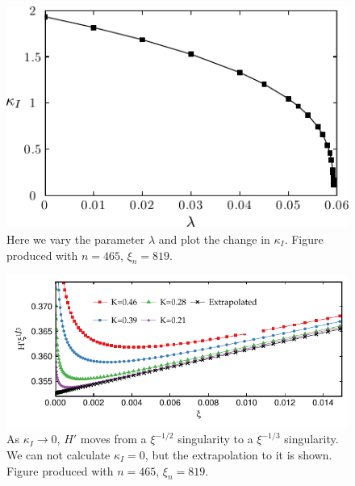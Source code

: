 \documentclass{jfm}
\begin{document}
\begin{figure}
  \centerline{\includegraphics{./../../Graphs/K-lambda-edited.pdf}}
  \caption{Here we vary the parameter $\lambda$ and plot the change in 
           $\kappa_I$. Figure produced with $n=465$, $\xi_n = 819$.}
\end{figure}
\begin{figure}
  \centerline{\includegraphics{./../../Graphs/hprime-x.pdf}}\label{fig:hprime-x}
  \caption{As $\kappa_I\to 0$, $H'$ moves from a $\xi^{-1/2}$ singularity
           to a $\xi^{-1/3}$ singularity. We can not calculate $\kappa_I=0$, 
           but the extrapolation to it is shown. Figure produced with $n=465$,
           $\xi_n = 819$.}
\end{figure}
\end{document}
